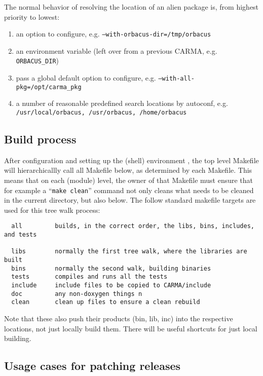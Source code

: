 \documentclass{article}
\begin{document}
The normal behavior of resolving the location of an alien package is, 
from highest priority to lowest:
\begin{enumerate}
\item
an option to configure, e.g. {\tt --with-orbacus-dir=/tmp/orbacus}
\item
an environment variable (left over from a previous CARMA, e.g. {\tt ORBACUS\_DIR})
\item
pass a global default option to configure, e.g. {\tt --with-all-pkg=/opt/carma\_pkg}
\item
a number of reasonable predefined search locations by autoconf,
e.g. {\tt /usr/local/orbacus, /usr/orbacus, /home/orbacus}

\end{enumerate}

\subsection{Build process}

After configuration and setting up the (shell) environment , the top level
Makefile will hierarchicallly call all Makefile below, as determined
by each Makefile. This means that on each (module) level, the owner of that
Makefile must ensure that for example a ``{\tt make clean}'' command
not only cleans what needs to be cleaned in the current directory, but also
below. The follow standard makefile targets are used for
this tree walk process:

\begin{verbatim}
  all         builds, in the correct order, the libs, bins, includes, and tests

  libs        normally the first tree walk, where the libraries are built
  bins        normally the second walk, building binaries
  tests       compiles and runs all the tests
  include     include files to be copied to CARMA/include
  doc         any non-doxygen things n
  clean       clean up files to ensure a clean rebuild
\end{verbatim}

Note that these also push their products (bin, lib, inc) into the respective
locations, not just locally build them. There will be useful shortcuts for
just local building.

\subsection{Usage cases for patching releases}
\end{document}
